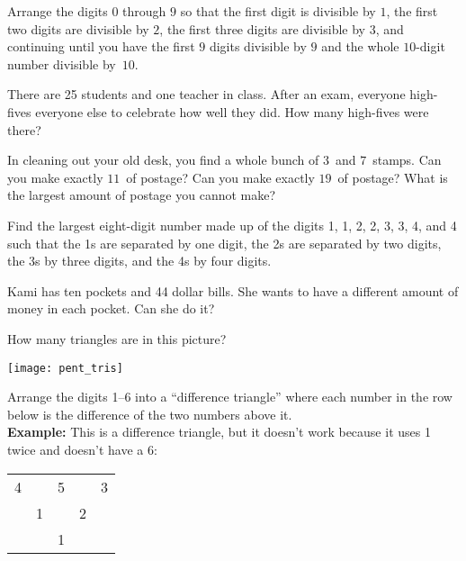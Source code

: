 \begin{problem}
Arrange the digits $0$ through $9$ so that the first digit is divisible by $1$, the first two digits are divisible by $2$, the first three digits are divisible by $3$, and continuing until you have the first $9$ digits divisible by $9$ and the whole $10$-digit number divisible by~$10$.
\end{problem}

\begin{problem}
There are 25 students and one teacher in class.  After an exam, everyone high-fives everyone else to celebrate how well they did.  How many high-fives were there?
\end{problem}




\begin{problem}
In cleaning out your old desk, you find a whole bunch of $3$\textcent\ and $7$\textcent\ stamps.  Can you make exactly $11$\textcent\ of postage?  Can you make exactly $19$\textcent\ of postage?  What is the largest amount of postage you cannot make?  
\end{problem}


\begin{problem}
Find the largest eight-digit number made up of the digits 1, 1, 2, 2, 3, 3, 4, and 4 such that the 1s are separated by one digit, the 2s are separated by two digits, the 3s by three digits, and the 4s by four digits.
\end{problem}



\begin{problem}
Kami has ten pockets and 44 dollar bills.  She wants to have a different amount of money in each pocket.  Can she do it?
\end{problem}


\begin{problem}
How many triangles are in this picture?
\begin{center}
\texttt{[image: pent\_tris]}
\end{center}


\end{problem}

\begin{problem}
Arrange the digits 1--6 into a ``difference triangle'' where each number in the row below is the difference of the two numbers above it.\\
{\bf Example:} This is a difference triangle, but it doesn't work because it uses 1 twice and doesn't have a 6:

\begin{center}
\begin{tabular}{c c c c c}
4 && 5 && 3 \\
 & 1 && 2\\
 &&1 \\
 \end{tabular}
 \end{center}
\end{problem}


